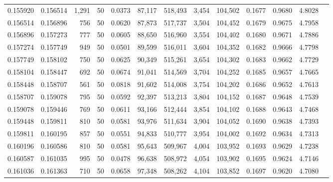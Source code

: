 \begin{tabular}{rrrrrrrrrrrrr}
0.155920 & 0.156514 & 1,291 &  50 &                                     0.0373 &  87,117 & 518,493 &   3,454 & 104,502 & 0.1677 & 0.9680 & 4.8028 \\
0.156514 & 0.156896 &   756 &  50 &                                     0.0620 &  87,873 & 517,737 &   3,504 & 104,452 & 0.1679 & 0.9675 & 4.7958 \\
0.156896 & 0.157273 &   777 &  50 &                                     0.0605 &  88,650 & 516,960 &   3,554 & 104,402 & 0.1680 & 0.9671 & 4.7886 \\
0.157274 & 0.157749 &   949 &  50 &                                     0.0501 &  89,599 & 516,011 &   3,604 & 104,352 & 0.1682 & 0.9666 & 4.7798 \\
0.157749 & 0.158102 &   750 &  50 &                                     0.0625 &  90,349 & 515,261 &   3,654 & 104,302 & 0.1683 & 0.9662 & 4.7729 \\
0.158104 & 0.158447 &   692 &  50 &                                     0.0674 &  91,041 & 514,569 &   3,704 & 104,252 & 0.1685 & 0.9657 & 4.7665 \\
0.158448 & 0.158707 &   561 &  50 &                                     0.0818 &  91,602 & 514,008 &   3,754 & 104,202 & 0.1686 & 0.9652 & 4.7613 \\
0.158707 & 0.159078 &   795 &  50 &                                     0.0592 &  92,397 & 513,213 &   3,804 & 104,152 & 0.1687 & 0.9648 & 4.7539 \\
0.159078 & 0.159446 &   769 &  50 &                                     0.0611 &  93,166 & 512,444 &   3,854 & 104,102 & 0.1688 & 0.9643 & 4.7468 \\
0.159448 & 0.159811 &   810 &  50 &                                     0.0581 &  93,976 & 511,634 &   3,904 & 104,052 & 0.1690 & 0.9638 & 4.7393 \\
0.159811 & 0.160195 &   857 &  50 &                                     0.0551 &  94,833 & 510,777 &   3,954 & 104,002 & 0.1692 & 0.9634 & 4.7313 \\
0.160196 & 0.160586 &   810 &  50 &                                     0.0581 &  95,643 & 509,967 &   4,004 & 103,952 & 0.1693 & 0.9629 & 4.7238 \\
0.160587 & 0.161035 &   995 &  50 &                                     0.0478 &  96,638 & 508,972 &   4,054 & 103,902 & 0.1695 & 0.9624 & 4.7146 \\
0.161036 & 0.161363 &   710 &  50 &                                     0.0658 &  97,348 & 508,262 &   4,104 & 103,852 & 0.1697 & 0.9620 & 4.7080 \\

\end{tabular}
